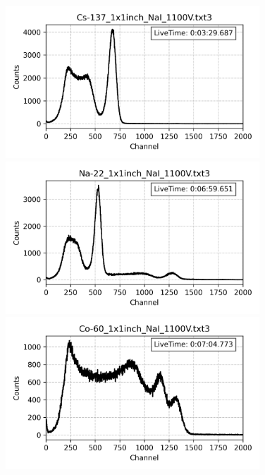 \begin{frame}[plain]
    \begin{columns}
        \begin{column}{0.5\textwidth}
            \begin{figure}
                \centering
                \includegraphics[width=0.85\textwidth]{images/Cs-137_1x1inch_NaI_1100V.png}
                \includegraphics[width=0.85\textwidth]{images/Na-22_1x1inch_NaI_1100V.png}
                \includegraphics[width=0.85\textwidth]{images/Co-60_1x1inch_NaI_1100V.png}


\end{figure}
\end{column}
\end{columns}
\end{frame}
